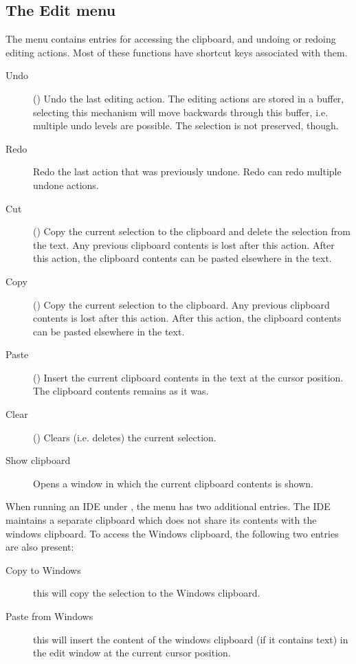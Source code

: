 \subsection{The Edit menu}
\label{se:menuedit}
The  menu contains entries for accessing the clipboard, and
undoing or redoing editing actions. Most of these functions have shortcut
keys associated with them.
\begin{description}
\item[Undo] ()
Undo the last editing action. The editing actions are stored in a buffer,
selecting this mechanism will move backwards through this buffer, i.e.
multiple undo levels are possible. The selection is not preserved, though.
\item[Redo] Redo the last action that was previously undone. Redo can redo
multiple undone actions. 
\item[Cut] () Copy the current selection to the clipboard
and delete the selection from the text. Any previous clipboard contents is
lost after this action. After this action, the clipboard contents can be 
pasted elsewhere in the text.
\item[Copy] () Copy the current selection to the clipboard.
Any previous clipboard contents is lost after this action. 
After this action, the clipboard contents can be pasted elsewhere in the text.
\item[Paste] () Insert the current clipboard contents in
the text at the cursor position. The clipboard contents remains as it was.
\item[Clear] () Clears (i.e. deletes) the current
selection.
\item[Show clipboard] Opens a window in which the current clipboard contents
is shown.
\end{description}
When running an IDE under \windows, the  menu has two
additional entries. The IDE maintains a separate clipboard which does 
not share its contents with the windows clipboard. To access the Windows
clipboard, the following two entries are also present:
\begin{description}
\item[Copy to Windows] this will copy the selection to the Windows
clipboard. 
\item[Paste from Windows] this will insert the content of the windows
clipboard (if it contains text) in the edit window at the current cursor
position.
\end{description}

